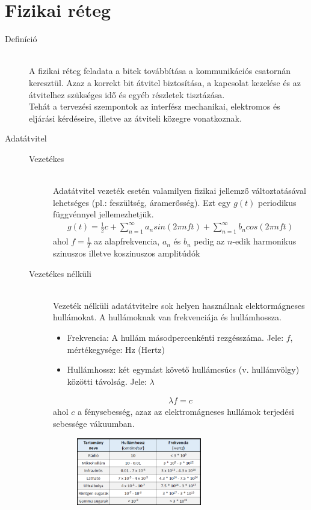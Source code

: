 \documentclass[margin=0px]{article}
\begin{document}
	\section{Fizikai réteg}
		\begin{description}
			\item[Definíció] \hfill \\
				A fizikai réteg feladata a bitek továbbítása a kommunikációs csatornán keresztül. Azaz a korrekt bit átvitel biztosítása, a kapcsolat kezelése és az átvitelhez szükséges idő és egyéb részletek tisztázása. \\
				Tehát a tervezési szempontok az interfész mechanikai, elektromos és eljárási kérdéseire, illetve az átviteli közegre vonatkoznak.
			\item[Adatátvitel] \hfill
				\begin{description}
					\item[Vezetékes] \hfill \\
						Adatátvitel vezeték esetén valamilyen fizikai jellemző változtatásával lehetséges (pl.: feszültség, áramerősség). Ezt egy $g(t)$ periodikus függvénnyel jellemezhetjük.
						\begin{align*}
							g(t) = \frac{1}{2}c+ \sum\limits_{n=1}^\infty a_nsin(2\pi n f t) + \sum\limits_{n=1}^\infty b_ncos(2\pi n f t) 
						\end{align*}					
						ahol $f=\frac{1}{T}$ az alapfrekvencia, $a_n$ és $b_n$ pedig az $n$-edik harmonikus szinuszos illetve koszinuszos amplitúdók
					\item[Vezetékes nélküli] \hfill \\	
						Vezeték nélküli adatátvitelre sok helyen használnak elektormágneses hullámokat. A hullámoknak van frekvenciája és hullámhossza.
						\begin{itemize}
							\item Frekvencia: 
								A hullám másodpercenkénti rezgésszáma. Jele: $f$, mértékegysége: Hz (Hertz)
							\item Hullámhossz: két egymást követő hullámcsúcs (v. hullámvölgy) közötti távolság. Jele: $\lambda$
						\end{itemize}
						\begin{align*}
							 \lambda f = c
						\end{align*}
						ahol $c$ a fénysebesség, azaz az elektromágneses hullámok terjedési sebessége vákuumban.
						\begin{figure}[H]
							\centering
							\includegraphics[width=0.6\textwidth]{img/elektromagneses.png}

\end{figure}
\end{description}
\end{description}
\end{document}
